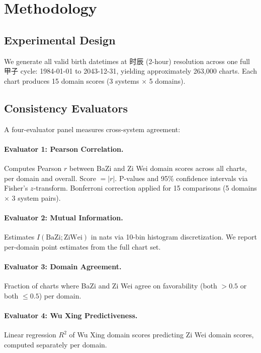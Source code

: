 \documentclass[11pt]{article}
\begin{document}
\section{Methodology}

\subsection{Experimental Design}

We generate all valid birth datetimes at 时辰 (2-hour) resolution across one full 甲子 cycle: 1984-01-01 to 2043-12-31, yielding approximately 263,000 charts.
Each chart produces 15 domain scores (3 systems $\times$ 5 domains).

\subsection{Consistency Evaluators}

A four-evaluator panel measures cross-system agreement:

\paragraph{Evaluator 1: Pearson Correlation.}
Computes Pearson $r$ between BaZi and Zi Wei domain scores across all charts, per domain and overall.
Score $= |r|$.
P-values and 95\% confidence intervals via Fisher's $z$-transform.
Bonferroni correction applied for 15 comparisons (5 domains $\times$ 3 system pairs).

\paragraph{Evaluator 2: Mutual Information.}
Estimates $I(\text{BaZi};\text{ZiWei})$ in nats via 10-bin histogram discretization.
We report per-domain point estimates from the full chart set.

\paragraph{Evaluator 3: Domain Agreement.}
Fraction of charts where BaZi and Zi Wei agree on favorability (both $> 0.5$ or both $\leq 0.5$) per domain.

\paragraph{Evaluator 4: Wu Xing Predictiveness.}
Linear regression $R^2$ of Wu Xing domain scores predicting Zi Wei domain scores, computed separately per domain.
\end{document}
